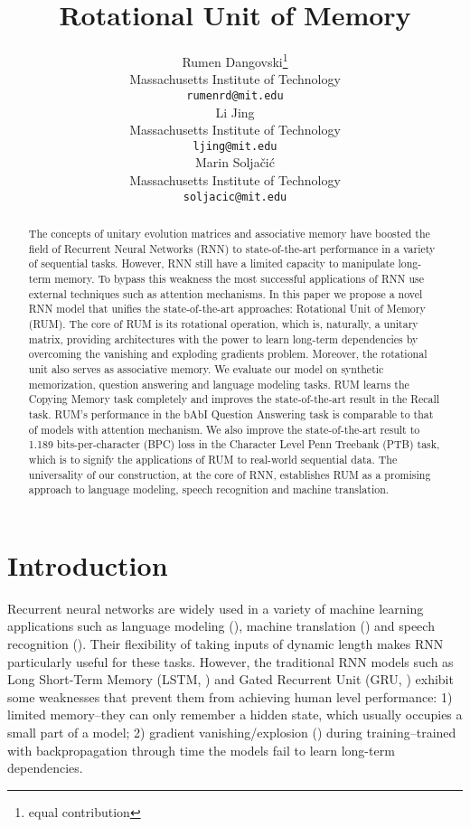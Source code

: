 \documentclass{article} \usepackage{iclr2018_conference,times}
\title{Rotational Unit of Memory}
\author{Rumen Dangovski\thanks{equal contribution} \\
Massachusetts Institute of Technology\\
\texttt{rumenrd@mit.edu} \\
\And
Li Jing\\
Massachusetts Institute of Technology\\
\texttt{ljing@mit.edu} \\
\AND
Marin Solja\v{c}i\'{c}\\
Massachusetts Institute of Technology\\
\texttt{soljacic@mit.edu} \\
}
\begin{document}
\maketitle


\begin{abstract}
The concepts of unitary evolution matrices and associative memory have boosted the field of Recurrent Neural Networks (RNN) to state-of-the-art performance in a variety of sequential tasks. However, RNN still have a limited capacity to manipulate long-term memory. To bypass this weakness the most successful applications of RNN use external techniques such as attention mechanisms. In this paper we propose a novel RNN model that unifies the state-of-the-art approaches: Rotational Unit of Memory (RUM). The core of RUM is its rotational operation, which is, naturally, a unitary matrix, providing architectures with the power to learn long-term dependencies by overcoming the vanishing and exploding gradients problem. Moreover, the rotational unit also serves as associative memory. We evaluate our model on synthetic memorization, question answering and language modeling tasks. RUM learns the Copying Memory task completely and improves the state-of-the-art result in the Recall task. RUM's performance in the bAbI Question Answering task is comparable to that of models with attention mechanism. We also improve the state-of-the-art result to 1.189 bits-per-character (BPC) loss in the Character Level Penn Treebank (PTB) task, which is to signify the applications of RUM to real-world sequential data. The universality of our construction, at the core of RNN, establishes RUM as a promising approach to language modeling, speech recognition and machine translation.
\end{abstract}

\section{Introduction}
Recurrent neural networks are widely used in a variety of machine learning applications such as language modeling (\cite{graves2014neural}), machine translation (\cite{cho2014properties}) and speech recognition (\cite{hinton2012deep}). Their flexibility of taking inputs of dynamic length makes RNN particularly useful for these tasks. However, the traditional RNN models such as Long Short-Term Memory (LSTM, \cite{hochreiter1997long}) and Gated Recurrent Unit (GRU, \cite{cho2014properties}) exhibit some weaknesses that prevent them from achieving human level performance: 1) limited memory--they can only remember a hidden state, which usually occupies a small part of a model;
2) gradient vanishing/explosion  (\cite{bengio1994learning}) during training--trained with backpropagation through time the models fail to learn long-term dependencies.
\end{document}

